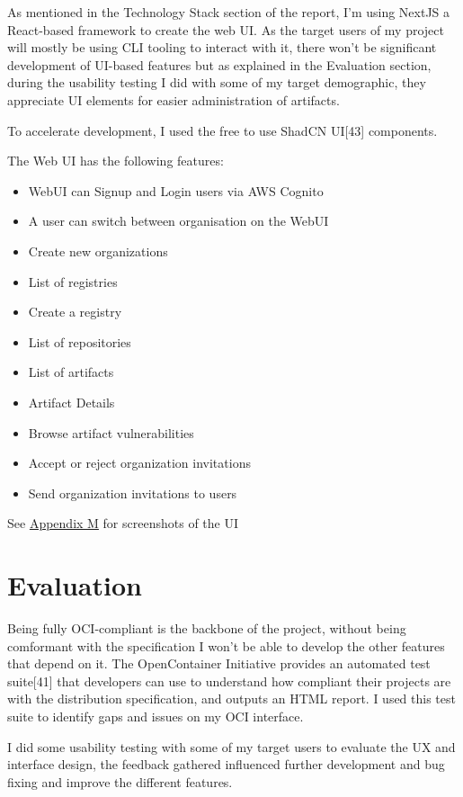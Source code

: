 \documentclass{article}
\begin{document}
  As mentioned in the Technology Stack section of the report, I'm using NextJS a React-based framework to create the web UI. As the target users of my project will mostly be using CLI tooling to interact with it, there won't be significant development of UI-based features but as explained in the Evaluation section, during the usability testing I did with some of my target demographic, they appreciate UI elements for easier administration of artifacts.

  To accelerate development, I used the free to use ShadCN UI[43] components.

  The Web UI has the following features:
  \begin{itemize}
    \item WebUI can Signup and Login users via AWS Cognito
    \item A user can switch between organisation on the WebUI
    \item Create new organizations
    \item List of registries
    \item Create a registry
    \item List of repositories
    \item List of artifacts
    \item Artifact Details
    \item Browse artifact vulnerabilities
    \item Accept or reject organization invitations
    \item Send organization invitations to users
  \end{itemize}

  See \hyperref[sec:appendix-m]{Appendix M} for screenshots of the UI

  \section{Evaluation}

  Being fully OCI-compliant is the backbone of the project, without being comformant with the specification I won't be able to develop the other features that depend on it. The OpenContainer Initiative provides an automated test suite[41] that developers can use to understand how compliant their projects are with the distribution specification, and outputs an HTML report. I used this test suite to identify gaps and issues on my OCI interface.

  I did some usability testing with some of my target users to evaluate the UX and interface design, the feedback gathered influenced further development and bug fixing and improve the different features.
\end{document}
